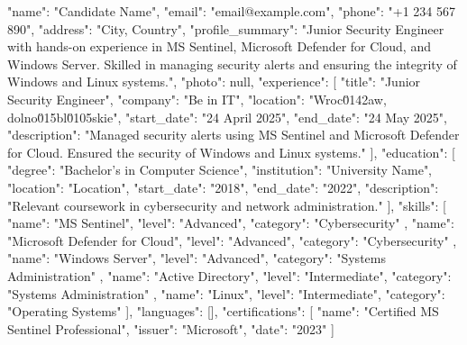 {
  "name": "Candidate Name",
  "email": "email@example.com",
  "phone": "+1 234 567 890",
  "address": "City, Country",
  "profile_summary": "Junior Security Engineer with hands-on experience in MS Sentinel, Microsoft Defender for Cloud, and Windows Server. Skilled in managing security alerts and ensuring the integrity of Windows and Linux systems.",
  "photo": null,
  "experience": [
    {
      "title": "Junior Security Engineer",
      "company": "Be in IT",
      "location": "Wroc\u0142aw, dolno\u015bl\u0105skie",
      "start_date": "24 April 2025",
      "end_date": "24 May 2025",
      "description": "Managed security alerts using MS Sentinel and Microsoft Defender for Cloud. Ensured the security of Windows and Linux systems."
    }
  ],
  "education": [
    {
      "degree": "Bachelor's in Computer Science",
      "institution": "University Name",
      "location": "Location",
      "start_date": "2018",
      "end_date": "2022",
      "description": "Relevant coursework in cybersecurity and network administration."
    }
  ],
  "skills": [
    {
      "name": "MS Sentinel",
      "level": "Advanced",
      "category": "Cybersecurity"
    },
    {
      "name": "Microsoft Defender for Cloud",
      "level": "Advanced",
      "category": "Cybersecurity"
    },
    {
      "name": "Windows Server",
      "level": "Advanced",
      "category": "Systems Administration"
    },
    {
      "name": "Active Directory",
      "level": "Intermediate",
      "category": "Systems Administration"
    },
    {
      "name": "Linux",
      "level": "Intermediate",
      "category": "Operating Systems"
    }
  ],
  "languages": [],
  "certifications": [
    {
      "name": "Certified MS Sentinel Professional",
      "issuer": "Microsoft",
      "date": "2023"
    }
  ]
}